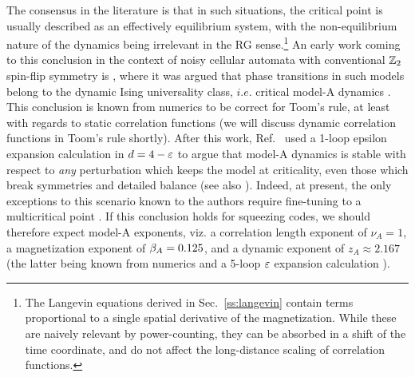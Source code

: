 \documentclass[pra,aps,twocolumn,groupedaddress,superscriptaddress,nofootinbib,preprintnumbers]{revtex4-2}
\begin{document}
	The consensus in the literature is that in such situations, the critical point is usually described as an effectively equilibrium system, with the non-equilibrium nature of the dynamics being irrelevant in the RG sense.\footnote{The Langevin equations derived in Sec.~\ref{ss:langevin} contain terms proportional to a single spatial derivative of the magnetization. While these are naively relevant by power-counting, they can be absorbed in a shift of the time coordinate, and do not affect the long-distance scaling of correlation functions.  } 
	An early work coming to this conclusion in the context of noisy cellular automata with conventional $\mathbb{Z}_2$ spin-flip symmetry is \cite{grinstein1985statistical}, where it was argued that phase transitions in such models belong to the dynamic Ising universality class, $i.e.$ critical model-A dynamics \cite{hohenberg1977theory}. This conclusion is known from numerics to be correct for Toom's rule, at least with regards to static correlation functions (we will discuss dynamic correlation functions in Toom's rule shortly). After this work, Ref.~\cite{bassler1994critical} used a 1-loop epsilon expansion calculation in $d=4-\varepsilon$ to argue that model-A dynamics is stable with respect to {\it any} perturbation which keeps the model at criticality, even those which break symmetries and detailed balance (see also \cite{tauber2002effects}). Indeed, at present, the only exceptions to this scenario known to the authors require fine-tuning to a multicritical point \cite{young2020nonequilibrium,agrawal2024dynamical}. If this conclusion holds for squeezing codes, we should therefore expect model-A exponents, viz. a correlation length exponent of $\nu_A = 1$, a magnetization exponent of $\beta_A = 0.125$, and a dynamic exponent of $z_A \approx 2.167$ (the latter being known from numerics and a 5-loop $\varepsilon$ expansion calculation \cite{adzhemyan2022dynamic,nightingale1996dynamic}). 
\end{document}
